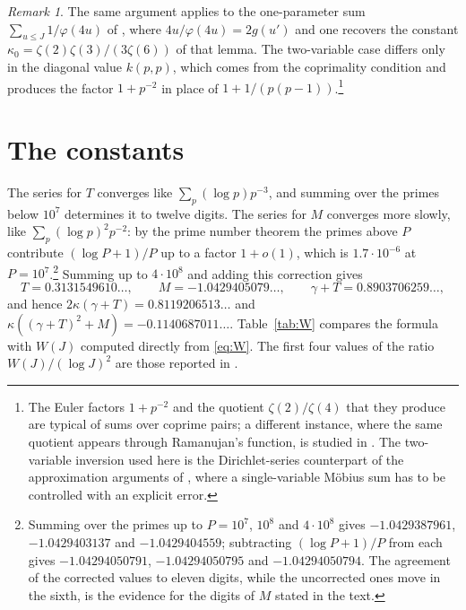 \documentclass{amsart}
\theoremstyle{definition}
\theoremstyle{remark}
\newtheorem{remark}[theorem]{Remark}
\numberwithin{equation}{section}
\begin{document}
\begin{remark}
The same argument applies to the one-parameter sum $\sum_{u\le J}1/\varphi(4u)$ of \cite[Lemma~4.21]{Dah}, where $4u/\varphi(4u)=2g(u')$ and one recovers the constant $\kappa_0=\zeta(2)\zeta(3)/(3\zeta(6))$ of that lemma. The two-variable case differs only in the diagonal value $k(p,p)$, which comes from the coprimality condition and produces the factor $1+p^{-2}$ in place of $1+1/(p(p-1))$.\footnote{The Euler factors $1+p^{-2}$ and the quotient $\zeta(2)/\zeta(4)$ that they produce are typical of sums over coprime pairs; a different instance, where the same quotient appears through Ramanujan's function, is studied in \cite{BBS23}. The two-variable inversion used here is the Dirichlet-series counterpart of the approximation arguments of \cite{BNFS26}, where a single-variable M\"obius sum has to be controlled with an explicit error.}
\end{remark}

\section{The constants}\label{sec:constants}

The series for $T$ converges like $\sum_p(\log p)p^{-3}$, and summing over the primes below $10^7$ determines it to twelve digits. The series for $M$ converges more slowly, like $\sum_p(\log p)^2p^{-2}$: by the prime number theorem the primes above $P$ contribute $(\log P+1)/P$ up to a factor $1+o(1)$, which is $1.7\cdot10^{-6}$ at $P=10^7$.\footnote{Summing over the primes up to $P=10^7$, $10^8$ and $4\cdot10^8$ gives $-1.0429387961$, $-1.0429403137$ and $-1.0429404559$; subtracting $(\log P+1)/P$ from each gives $-1.04294050791$, $-1.04294050795$ and $-1.04294050794$. The agreement of the corrected values to eleven digits, while the uncorrected ones move in the sixth, is the evidence for the digits of $M$ stated in the text.} Summing up to $4\cdot10^8$ and adding this correction gives
\[
T=0.3131549610\ldots,\qquad M=-1.0429405079\ldots,\qquad \gamma+T=0.8903706259\ldots,
\]
and hence $2\kappa(\gamma+T)=0.8119206513\ldots$ and $\kappa((\gamma+T)^2+M)=-0.1140687011\ldots$. Table~\ref{tab:W} compares the formula with $W(J)$ computed directly from \eqref{eq:W}. The first four values of the ratio $W(J)/(\log J)^2$ are those reported in \cite[Section~6, item~(8)]{Dah}.
\end{document}

